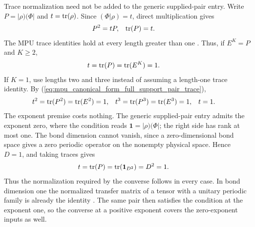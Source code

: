 \documentclass{article}
\begin{document}
\begin{itemize}
          Trace normalization need not be added to the generic supplied-pair
          entry. Write $P=\lvert\rho)(\Phi\rvert$ and $t=\operatorname{tr}(\rho)$.
          Since $(\Phi\vert\rho)=t$, direct multiplication gives
          \begin{align}
              P^2 & =tP, & \operatorname{tr}(P) & =t.
              \label{eq:mpu_canonical_form_full_support_pair_trace}
          \end{align}
          The MPU trace identities hold at every length greater than one
          \cite[lines~349--354]{Cirac2017MPU}. Thus, if $E^K=P$ and $K\geq2$,
          \begin{align}
              t & =\operatorname{tr}(P)=\operatorname{tr}(E^K)=1.
              \label{eq:mpu_canonical_form_full_support_trace_large_exponent}
          \end{align}
          If $K=1$, use lengths two and three instead of assuming a
          length-one trace identity. By
          (\ref{eq:mpu_canonical_form_full_support_pair_trace}),
          \begin{align}
              t^2 & =\operatorname{tr}(P^2)=\operatorname{tr}(E^2)=1, &
              t^3 & =\operatorname{tr}(P^3)=\operatorname{tr}(E^3)=1, & t & =1.
              \label{eq:mpu_canonical_form_full_support_trace_exponent_one}
          \end{align}
          The exponent premise costs nothing. The generic supplied-pair entry
          admits the exponent zero, where the condition reads
          $\mathbf 1=\lvert\rho)(\Phi\rvert$; the right side has rank at most
          one. The bond dimension cannot vanish, since a zero-dimensional
          bond space gives a zero periodic operator on the nonempty physical
          space. Hence $D=1$, and taking traces gives
          \begin{align}
              t & =\operatorname{tr}(P)=\operatorname{tr}(\mathbf 1_{D^2})=D^2=1.
              \label{eq:mpu_canonical_form_full_support_trace_exponent_zero}
          \end{align}
          Thus the normalization required by the converse follows in every
          case. In bond dimension one the normalized transfer matrix of a
          tensor with a unitary periodic
          family is already the identity
          \cite[lines~397--409]{Cirac2017MPU}. The same pair then satisfies
          the condition at the exponent one, so the converse at a positive
          exponent covers the zero-exponent inputs as well.


\end{itemize}
\end{document}
